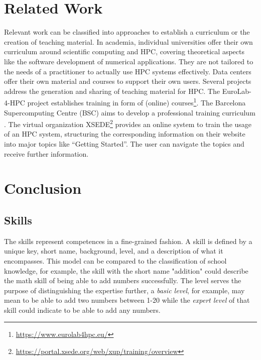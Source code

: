 \documentclass[jocse]{jocseart}
\newcommand{\jk}[1]{\todo[inline]{TODO: #1}}
\begin{document}
\section{Related Work}
\jk{Please everyone!}

Relevant work can be classified into approaches to establish a curriculum or the creation of teaching material.
In academia, individual universities offer their own curriculum around scientific computing and HPC, covering theoretical aspects like the software development of numerical applications.
They are not tailored to the needs of a practitioner to actually use HPC systems effectively.
Data centers offer their own material and courses to support their own users.
Several projects address the generation and sharing of teaching material for HPC.
The EuroLab-4-HPC project establishes training in form of (online) courses\footnote{\url{https://www.eurolab4hpc.eu/}}.
The Barcelona Supercomputing Centre (BSC) aims to develop a professional training curriculum \cite{sancho2016bsc}.
The virtual organization XSEDE\footnote{\url{https://portal.xsede.org/web/xup/training/overview}} provides an online system to train the usage of an HPC system, structuring the corresponding information on their website into major topics like “Getting Started”.
The user can navigate the topics and receive further information.

\section{Conclusion}






\jk{Old stuff}


\subsection{Skills}

The skills represent competences in a fine-grained fashion.
A skill is defined by a unique key, short name, background, level, and a description of what it encompasses.
This model can be compared to the classification of school knowledge, for example, the skill with the short name "addition" could describe the math skill of being able to add numbers successfully.
The level serves the purpose of distinguishing the expertise further, a \textit{basic level}, for example, may mean to be able to add two numbers between 1-20 while the \textit{expert level} of that skill could indicate to be able to add any numbers.
\end{document}
